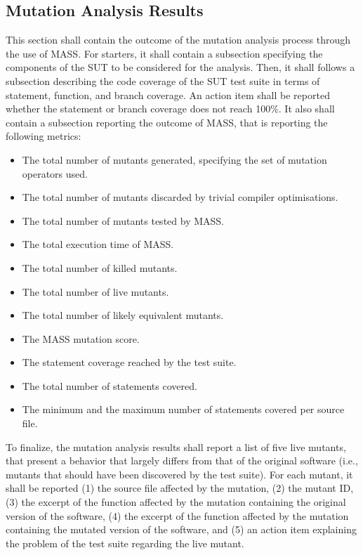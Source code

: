 \subsection{Mutation Analysis Results}

This section shall contain the outcome of the mutation analysis process through the use of MASS. For starters, it shall contain a subsection specifying the components of the SUT to be considered for the analysis. Then, it shall follows a subsection describing the code coverage of the SUT test suite in terms of statement, function, and branch coverage. An action item shall be reported whether the statement or branch coverage does not reach 100\%.
It also shall contain a subsection reporting the outcome of MASS, that is reporting the following metrics:
\begin{itemize}
    \item The total number of mutants generated, specifying the set of mutation operators used.
    \item The total number of mutants discarded by trivial compiler optimisations.
    \item The total number of mutants tested by MASS.
    \item The total execution time of MASS.
    \item The total number of killed mutants.
    \item The total number of live mutants.
    \item The total number of likely equivalent mutants.
    \item The MASS mutation score.
    \item The statement coverage reached by the test suite.
    \item The total number of statements covered.
    \item The minimum and the maximum number of statements covered per source file.
\end{itemize}

To finalize, the mutation analysis results shall report a list of five live mutants, that present a behavior that largely differs from that of the original software (i.e., mutants that should have been discovered by the test suite). For each mutant, it shall be reported (1)
 the source file affected by the mutation, (2) the mutant ID, (3) the excerpt of the function affected by the mutation containing the original version of the software, (4) the excerpt of the function affected by the mutation containing the mutated version of the software, and (5) an action item explaining the problem of the test suite regarding the live mutant.

